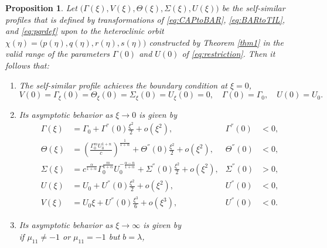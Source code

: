 \documentclass[a4paper,11pt]{article}
\newtheorem{proposition}{Proposition}[section]
\theoremstyle{remark}
\begin{document}
%
%
\begin{proposition} \label{prop:ss}
Let $\big(\Gamma(\xi),V(\xi),\Theta(\xi),\Sigma(\xi),U(\xi)\big)$ be the self-similar profiles that is defined by transformations of \eqref{eq:CAPtoBAR}, \eqref{eq:BARtoTIL}, and \eqref{eq:pqrdef} upon to the heteroclinic orbit $\chi(\eta)=\big(p(\eta),q(\eta),r(\eta),s(\eta)\big)$ constructed by Theorem \ref{thm1} in the valid range of the parameters $\Gamma(0)$ and $U(0)$ of \eqref{eq:restriction}. Then it follows that:
 \begin{enumerate}
  \item[(i)] The self-similar profile achieves the boundary condition at $\xi=0$,
    \begin{equation*}
    {V}(0) = \Gamma_\xi(0) = \Theta_\xi(0)=\Sigma_\xi(0) = {U}_\xi(0)=0, \quad \Gamma(0)=\Gamma_0, \quad U(0)=U_0.
  \end{equation*}
  \item[(ii)] Its asymptotic behavior as $\xi \rightarrow 0$ is given by
  \begin{equation} \label{eq:ss_asymp0}
  \begin{aligned}
    \Gamma(\xi) &= \Gamma_0 + \Gamma^{''}(0)\frac{\xi^2}{2} + o(\xi^2), & \Gamma^{''}(0)&<0,\\
    \Theta(\xi) &= \left(\frac{\Gamma_0^m U_0^{1+n}}{c}\right)^{\frac{1}{1+\alpha}} + \Theta^{''}(0)\frac{\xi^2}{2} + o(\xi^2), & \Theta^{''}(0)&<0,\\
    \Sigma(\xi) &= c^{\frac{\alpha}{1+\alpha}}\Gamma_0^{\frac{m}{1+\alpha}} U_0^{-\frac{\alpha-n}{1+\alpha}}+ \Sigma^{''}(0)\frac{\xi^2}{2} + o(\xi^2), & \Sigma^{''}(0)&>0, \\
    U(\xi) &= U_0 + U^{''}(0)\frac{\xi^2}{2} + o(\xi^2), & U^{''}(0)&<0,\\
    V(\xi) &= U_0\xi + U^{''}(0)\frac{\xi^3}{6} + o(\xi^3), & U^{''}(0)&<0.
  \end{aligned}
  \end{equation}
  \item[(iii)] Its asymptotic behavior as $\xi \rightarrow \infty$ is given by\\
  if $\mu_{11}\ne-1$ or $\mu_{11}=-1$ but $b=\lambda$,

\end{enumerate}
\end{proposition}
\end{document}
